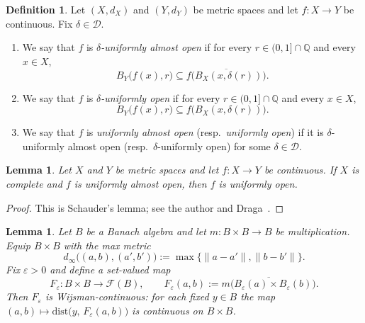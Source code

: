 \documentclass[12pt,fleqn,a4paper]{amsart}
\numberwithin{equation}{section}
\newtheorem{lemma}[theorem]{Lemma}
\theoremstyle{definition}
\newtheorem{definition}[theorem]{Definition}
\newcommand{\Q}{\mathbb{Q}}
\newcommand{\dist}{\mathrm{dist}}
\begin{document}
\begin{definition}\label{def:UAO-UO}
Let $(X,d_X)$ and $(Y,d_Y)$ be metric spaces and let $f:X\to Y$ be continuous.
Fix $\delta\in\mathcal D$.

\begin{enumerate}
\item We say that $f$ is \emph{$\delta$-uniformly almost open} if for every
$r\in(0,1]\cap\Q$ and every $x\in X$,
\[
B_Y\bigl(f(x),r\bigr)\subseteq \overline{f\bigl(B_X(x,\delta(r))\bigr)}.
\]

\item We say that $f$ is \emph{$\delta$-uniformly open} if for every
$r\in(0,1]\cap\Q$ and every $x\in X$,
\[
B_Y\bigl(f(x),r\bigr)\subseteq f\bigl(B_X(x,\delta(r))\bigr).
\]

\item We say that $f$ is \emph{uniformly almost open} (resp.\ \emph{uniformly open})
if it is $\delta$-uniformly almost open (resp.\ $\delta$-uniformly open) for some
$\delta\in\mathcal D$.
\end{enumerate}
\end{definition}

\begin{lemma}\label{lem:schauder}
Let $X$ and $Y$ be metric spaces and let $f:X\to Y$ be continuous.
If $X$ is complete and $f$ is uniformly almost open, then $f$ is uniformly open.
\end{lemma}

\begin{proof}
This is Schauder's lemma; see the author and Draga~\cite[Lemma~2.1]{DragaKania}.
\end{proof}

\begin{lemma}\label{lem:mult-balls-cont}
Let $B$ be a Banach algebra and let $m:B\times B\to B$ be multiplication.
Equip $B\times B$ with the max metric
\[
d_\infty\bigl((a,b),(a',b')\bigr):=\max\{\|a-a'\|,\|b-b'\|\}.
\]
Fix $\varepsilon>0$ and define a set-valued map
\[
F_\varepsilon:B\times B\to\mathscr F(B),\qquad
F_\varepsilon(a,b):=\overline{m\bigl(B_\varepsilon(a)\times B_\varepsilon(b)\bigr)}.
\]
Then $F_\varepsilon$ is Wijsman-continuous: for each fixed $y\in B$ the map
$(a,b)\mapsto \dist\bigl(y,\,F_\varepsilon(a,b)\bigr)$
is continuous on $B\times B$.
\end{lemma}
\end{document}

